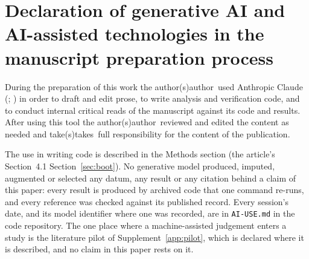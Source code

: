 \section*{Declaration of generative AI and AI-assisted technologies in the manuscript preparation process}

During the preparation of this work the \ifblind author(s)\else author\fi\
used Anthropic Claude (\aiModelId; \aiModelDate) in order to draft and edit
prose, to write analysis and verification code, and to conduct internal
critical reads of the manuscript against its code and results. After using this tool
the \ifblind author(s)\else author\fi\ reviewed and edited the content as
needed and \ifblind take(s)\else takes\fi\ full responsibility for the
content of the publication.

The use in writing code is described in the Methods section
(\ifdefined\titlepagedocument the article's Section~4.1\else
Section~\ref{sec:boot}\fi). No
generative model produced, imputed, augmented or selected any datum, any
result or any citation behind a claim of this paper: every result is
produced by archived code that one command re-runs, and every reference was
checked against its published record. Every session's date, and its model
identifier where one was recorded, are in \texttt{AI-USE.md} in the code
repository. The one
place where a machine-assisted judgement enters a study is the literature
pilot of Supplement~\ref{app:pilot}, which is declared where it is
described, and no claim in this paper rests on it.
